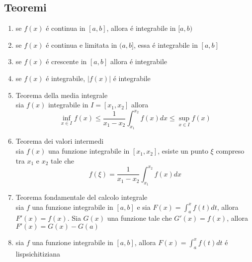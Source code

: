 \documentclass{exam}
\begin{document}
	\subsection{Teoremi}
		\begin{enumerate}
			\item
				se $f(x)$ \'e continua in $[a,b]$, allora \'e integrabile in $[a,b)$
			\item
				se $f(x)$ \'e continua e limitata in $(a,b]$, essa \'e integrabile in $[a,b]$
			\item
				se $f(x)$ \'e crescente in $[a,b]$ allora \'e integrabile
			\item 
				se $f(x)$ \'e integrabile, $|f(x)|$ \'e integrabile
			\item{Teorema della media integrale}\\
				sia $f(x)$ integrabile in $I=[x_1,x_2]$ allora 
				\begin{equation}
					\inf_{x\in I}f(x)\le\frac{1}{x_1-x_2}\int_{x_1}^{x_2} f(x)dx\le \sup_{x\in I}f(x)
				\end{equation}
			\item{Teorema dei valori intermedi}\\
				sia $f(x)$ una funzione integrabile in $[x_1,x_2]$, esiste un punto $\xi$ compreso tra $x_1$ e $x_2$ tale che 
				\begin{equation}
					f(\xi)=\frac{1}{x_1-x_2}\int_{x_1}^{x_2} f(x)dx
				\end{equation}
			\item{Teorema fondamentale del calcolo integrale}\\
				sia $f$ una funzione integrabile in $[a,b]$ e sia \(\displaystyle F(x)=\int_a^x f(t)dt \), allora $F'(x)=f(x)$.
				Sia $G(x)$ una funzione tale che $G'(x)=f(x)$, allora $F'(x)=G(x)-G(a)$
			\item
				sia $f$ una funzione integrabile in $[a,b]$, allora \(\displaystyle F(x)=\int_a^x f(t)dt \) \'e lispsichitiziana
		\end{enumerate}
\end{document}
